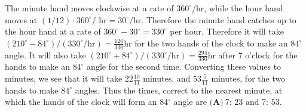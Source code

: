 \begin{enumerate}
 The minute hand moves clockwise at a rate of $360^{\circ}/\text{hr}$, while the hour hand moves at $(1/12)\cdot 360^{\circ}/\text{ hr}=30^{\circ}/\text{hr}$. Therefore the minute hand catches up to the hour hand at a rate of $360^{\circ}-30^{\circ}=330^{\circ}$ per hour. Therefore it will take $(210^{\circ}-84^{\circ})/(330^{\circ}/\text{hr})=\frac{126}{330}\text{hr}$ for the two hands of the clock to make an $84^{\circ}$ angle. It will also take $(210^{\circ}+84^{\circ})/(330^{\circ}/\text{hr})=\frac{294}{330}\text{hr}$ after $7$ o'clock for the hands to make an $84^{\circ}$ angle for the second time. Converting these values to minutes, we see that it will take $22\frac{10}{11}$ minutes, and $53\frac{5}{11}$ minutes, for the two hands to make $84^{\circ}$ angles. Thus the times, correct to the nearest minute, at which the hands of the clock will form an $84^{\circ}$ angle are $\boxed{\textbf{(A)}\ \text{7: 23 and 7: 53}}$.

 


\end{enumerate}